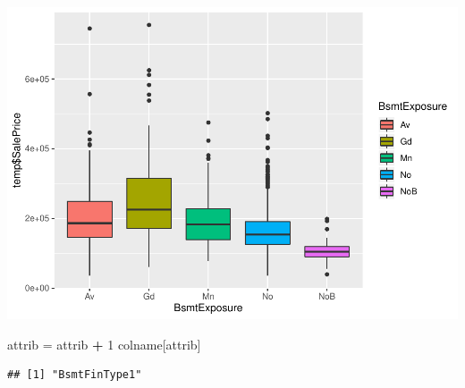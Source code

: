 \documentclass[]{article}
\newenvironment{Shaded}{\begin{snugshade}}{\end{snugshade}}
\newcommand{\DecValTok}[1]{\textcolor[rgb]{0.00,0.00,0.81}{#1}}
\newcommand{\StringTok}[1]{\textcolor[rgb]{0.31,0.60,0.02}{#1}}
\newcommand{\OperatorTok}[1]{\textcolor[rgb]{0.81,0.36,0.00}{\textbf{#1}}}
\newcommand{\NormalTok}[1]{#1}
\begin{document}
\includegraphics{EDA_files/figure-latex/unnamed-chunk-55-1.pdf}

\begin{Shaded}
\begin{Highlighting}[]
\NormalTok{attrib =}\StringTok{ }\NormalTok{attrib }\OperatorTok{+}\StringTok{ }\DecValTok{1}
\NormalTok{colname[attrib]}
\end{Highlighting}
\end{Shaded}

\begin{verbatim}
## [1] "BsmtFinType1"
\end{verbatim}
\end{document}
